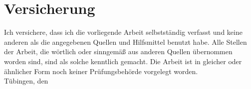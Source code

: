 \documentclass[12pt,oneside,a4paper]{scrreprt}
\begin{document}
\newpage
\section{Versicherung}
\normalsize
\noindent Ich versichere, dass ich die vorliegende Arbeit selbstständig verfasst und keine anderen als die angegebenen Quellen und Hilfsmittel benutzt habe. Alle Stellen der Arbeit, die wörtlich oder sinngemäß aus anderen Quellen übernommen worden sind, sind als solche kenntlich gemacht. Die Arbeit ist in gleicher oder ähnlicher Form noch keiner Prüfungsbehörde vorgelegt worden.\\%

\noindent
Tübingen, den \date \\[4ex]

\noindent \MyAuthor
\end{document}
